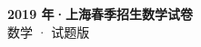 \documentclass[zihao=-4, a4paper]{ctexart}
\begin{document}
\begin{center}
  {\Large\bfseries 2019 年·上海春季招生数学试卷}\\[4pt]
  {\large 数学 · 试题版}
\end{center}
\medskip
{}

\end{document}
